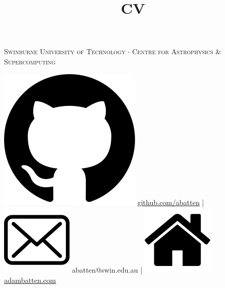 \documentclass[11pt]{extarticle}
\title{CV}
\begin{document}
\noindent
{ \par}

{\center \textsc{Swinburne University of Technology \hspace{0.5ex} $\cdot$ \hspace{0.5ex} Centre for Astrophysics \& Supercomputing} \par} %
\vspace{-1ex}
{\center \includegraphics[height=\fontcharht\font`\B]{images/icons/github.png} \hspace{0.5ex} \href{https://github.com/abatten}{github.com/abatten} \hspace{0.5ex} | \hspace{0.5ex} \includegraphics[height=\fontcharht\font`\B]{images/icons/email.png} \hspace{0.5ex} abatten@swin.edu.au \hspace{0.5ex} | \hspace{0.5ex} \includegraphics[height=\fontcharht\font`\B]{images/icons/home.png} \hspace{0.5ex} \href{https://adambatten.com}{adambatten.com} \par}
\end{document}
